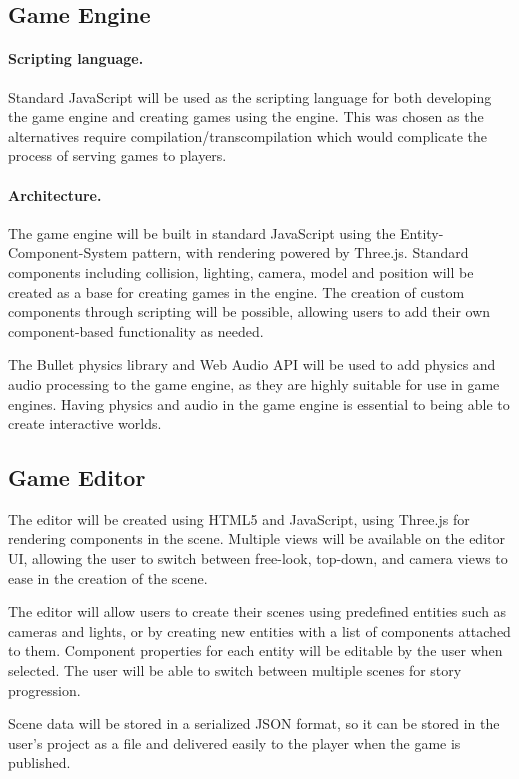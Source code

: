 \documentclass[a4paper, 12pt]{article}
\begin{document}
\subsection{Game Engine}
\paragraph{Scripting language.}
Standard JavaScript will be used as the scripting language for both developing the game engine and creating games using the engine. This was chosen as the alternatives require compilation/transcompilation which would complicate the process of serving games to players.

\paragraph{Architecture.}
The game engine will be built in standard JavaScript using the Entity-Component-System pattern, with rendering powered by Three.js. Standard components including collision, lighting, camera, model and position will be created as a base for creating games in the engine. The creation of custom components through scripting will be possible, allowing users to add their own component-based functionality as needed.

The Bullet physics library and Web Audio API will be used to add physics and audio processing to the game engine, as they are highly suitable for use in game engines. Having physics and audio in the game engine is essential to being able to create interactive worlds.

\subsection{Game Editor}
The editor will be created using HTML5 and JavaScript, using Three.js for rendering components in the scene. Multiple views will be available on the editor UI, allowing the user to switch between free-look, top-down, and camera views to ease in the creation of the scene.

The editor will allow users to create their scenes using predefined entities such as cameras and lights, or by creating new entities with a list of components attached to them. Component properties for each entity will be editable by the user when selected. The user will be able to switch between multiple scenes for story progression.

Scene data will be stored in a serialized JSON format, so it can be stored in the user's project as a file and delivered easily to the player when the game is published.
\end{document}
